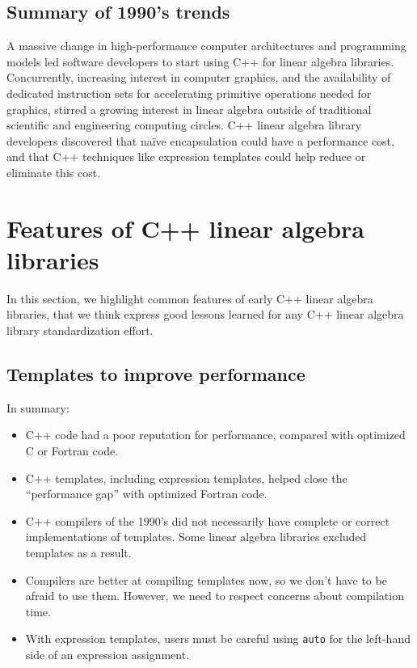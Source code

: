 \subsection{Summary of 1990's trends}
\label{SS:90s:summary}

A massive change in high-performance computer architectures and
programming models led software developers to start using C++ for
linear algebra libraries.  Concurrently, increasing interest in
computer graphics, and the availability of dedicated instruction sets
for accelerating primitive operations needed for graphics, stirred a
growing interest in linear algebra outside of traditional scientific
and engineering computing circles.  C++ linear algebra library
developers discovered that na\"ive encapsulation could have a
performance cost, and that C++ techniques like expression templates
could help reduce or eliminate this cost.

\section{Features of C++ linear algebra libraries}
\label{S:features}

In this section, we highlight common features of early C++ linear
algebra libraries, that we think express good lessons learned for any
C++ linear algebra library standardization effort.

\subsection{Templates to improve performance}
\label{SS:features:templates}

In summary:
\begin{itemize}
\item C++ code had a poor reputation for performance, compared with
  optimized C or Fortran code.
\item C++ templates, including expression templates, helped close the
  ``performance gap'' with optimized Fortran code.
\item C++ compilers of the 1990's did not necessarily have complete or
  correct implementations of templates.  Some linear algebra libraries
  excluded templates as a result.
\item Compilers are better at compiling templates now, so we don't
  have to be afraid to use them.  However, we need to respect concerns
  about compilation time.
\item With expression templates, users must be careful using
  \texttt{auto} for the left-hand side of an expression assignment.
\end{itemize}

